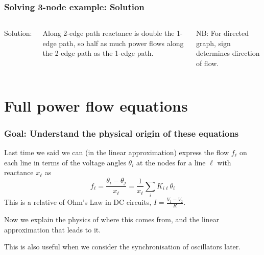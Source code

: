 \documentclass[10pt,aspectratio=169,dvipsnames]{beamer}
\begin{document}
\begin{frame}
  \frametitle{Solving 3-node example: Solution}

  \vspace{.3cm}

  \begin{columns}


  Solution:
  \vspace{.3cm}

    \centering

  \raggedright


      Along 2-edge path reactance is double the 1-edge path, so half as much power flows along the 2-edge path as the 1-edge path.

      \vspace{.5cm}
  NB: For directed graph, sign determines direction of flow.

  \end{columns}
\end{frame}




\section{Full power flow equations}


\begin{frame}
  \frametitle{Goal: Understand the physical origin of these equations}

  Last time we said we can (in the linear approximation) express the
  flow $f_\ell$ on each line in terms of the voltage angles $\theta_i$
  at the nodes for a line $\ell$ with
  reactance $x_\ell$ as
  \begin{equation*}
    f_\ell = \frac{\theta_i - \theta_j}{x_\ell} = \frac{1}{x_\ell}\sum_{i} K_{i\ell} \theta_i
  \end{equation*}
   This is a relative of Ohm's Law in DC circuits, $I = \frac{V_1 - V_2}{R}$.


  Now we explain the physics of where this comes from, and the linear approximation
  that leads to it.

  This is also useful when we consider the synchronisation of
  oscillators later.
\end{frame}
\end{document}
